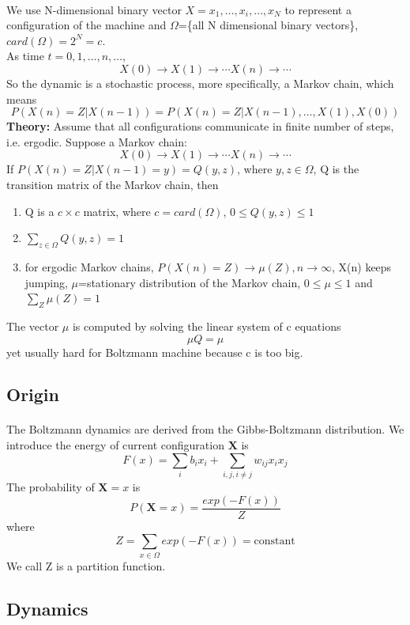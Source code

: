 \documentclass{article}
\begin{document}
\paragraph{}
We use N-dimensional binary vector $X={x_{1},\dots,x_{i},\dots,x_{N}}$ to represent a configuration of the machine and $\Omega$=\{all N dimensional binary vectors\}, $card(\Omega)=2^{N}=c$. \\
As time $t=0,1,\dots,n,\dots$,
\[X(0)\rightarrow X(1)\rightarrow\cdots X(n)\rightarrow\cdots\]
So the dynamic is a stochastic process, more specifically, a Markov chain, which means
\[P(X(n)=Z|X(n-1))=P(X(n)=Z|X(n-1),\dots,X(1),X(0))\]
\textbf{Theory:} Assume that all configurations communicate in finite number of steps, i.e. ergodic. Suppose a Markov chain:
\[X(0)\rightarrow X(1)\rightarrow\cdots X(n)\rightarrow\cdots\]
If $P(X(n)=Z|X(n-1)=y)=Q(y,z)$, where $y,z \in \Omega$, Q is the transition matrix of the Markov chain, then
\begin{enumerate}
  \item Q is a $c\times c$ matrix, where $c=card(\Omega)$, $0\leq Q(y,z)\leq 1$
  \item $\sum\limits_{z\in\Omega}Q(y,z)=1$
  \item for ergodic Markov chains, $P(X(n)=Z)\rightarrow\mu(Z), n\rightarrow\infty$, X(n) keeps jumping, $\mu$=stationary distribution of the Markov chain, $0\leq\mu\leq1$ and $\sum\limits_{Z}\mu(Z)=1$
\end{enumerate}
The vector $\mu$ is computed by solving the linear system of c equations
\[\mu Q=\mu\]
yet usually hard for Boltzmann machine because c is too big.

\subsection{Origin}
\paragraph{}
The Boltzmann dynamics are derived from the Gibbs-Boltzmann distribution. We introduce the energy of current configuration $\textbf{X}$ is \[F(x)=\sum\limits_{i}b_{i}x_{i}+\sum\limits_{i,j,i\neq j}w_{ij}x_{i}x_{j}\]
The probability of $\textbf{X}=x$ is \[P(\textbf{X}=x)=\frac{exp(-F(x))}{Z}\]
where \[Z=\sum\limits_{x\in\Omega}exp(-F(x))=\text{constant}\]
We call Z is a partition function.

\subsection{Dynamics}
\end{document}
